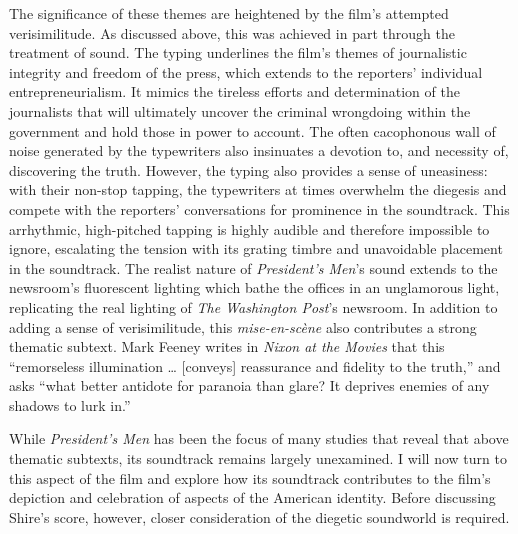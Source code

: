 The significance of these themes are heightened by the film's attempted verisimilitude.
As discussed above, this was achieved in part through the treatment of sound.
The typing underlines the film’s themes of journalistic integrity and freedom of the press, which extends to the reporters' individual entrepreneurialism.
It mimics the tireless efforts and determination of the journalists that will ultimately uncover the criminal wrongdoing within the government and hold those in power to account.
The often cacophonous wall of noise generated by the typewriters also insinuates a devotion to, and necessity of, discovering the truth.
However, the typing also provides a sense of uneasiness: with their non-stop tapping, the typewriters at times overwhelm the diegesis and compete with the reporters’ conversations for prominence in the soundtrack.
This arrhythmic, high-pitched tapping is highly audible and therefore impossible to ignore, escalating the tension with its grating timbre and unavoidable placement in the soundtrack. 
The realist nature of \textit{President’s Men}’s sound extends to the newsroom’s fluorescent lighting which bathe the offices in an unglamorous light, replicating the real lighting of \textit{The Washington Post}'s newsroom.\autocites[Cinematographer Gordon Willis writes about the use of fluorescent lights to replicate the exact look and feel of \textit{The Washington Post}'s newsroom: ``Prior to construction, the lighting was discussed at length and, since the real newsroom is lit exclusively with fluorescent lamps, my feeling was to keep it just that way. Fluorescent has a look all its own and I wanted to retain that look. So, fluorescent it was."][]{willis_photographing_2019}
In addition to adding a sense of verisimilitude, this \textit{mise-en-scène }also contributes a strong thematic subtext.
Mark Feeney writes in \textit{Nixon at the Movies} that this ``remorseless illumination … [conveys] reassurance and fidelity to the truth,” and asks “what better antidote for paranoia than glare? It deprives enemies of any shadows to lurk in.”\autocites[][263]{feeney_nixon_2004} 

While \textit{President’s Men }has been the focus of many studies that reveal that above thematic subtexts, its soundtrack remains largely unexamined.
I will now turn to this aspect of the film and explore how its soundtrack contributes to the film’s depiction and celebration of aspects of the American identity.
Before discussing Shire's score, however, closer consideration of the diegetic soundworld is required.


